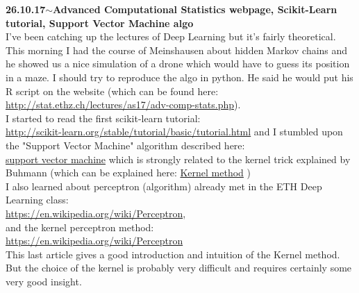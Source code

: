 \documentclass[11pt,a4paper]{article}
\newenvironment{loggentry}[2]%
{\noindent\textbf{#1}\hspace{1cm}$\mathbf{\sim}$\text{ }\textbf{#2}\\}{\vspace{0.5cm}}
\begin{document}
\begin{loggentry}{26.10.17}{Advanced Computational Statistics webpage, Scikit-Learn tutorial, Support Vector Machine algo}
I've been catching up the lectures of Deep Learning but it's fairly theoretical. This morning I had the course of Meinshausen about hidden Markov chains and he showed us a nice simulation of a drone which would have to guess its position in a maze. I should try to reproduce the algo in python. He said he would put his R script on the website (which can be found here:\\
\url{http://stat.ethz.ch/lectures/as17/adv-comp-stats.php}).\\
I started to read the first scikit-learn tutorial:\\
\url{http://scikit-learn.org/stable/tutorial/basic/tutorial.html}
and I stumbled upon the "Support Vector Machine" algorithm described here:\\
\href{https://en.wikipedia.org/wiki/Support_vector_machine}{support vector machine}
which is strongly related to the kernel trick explained by Buhmann (which can be explained here:
\href{https://en.wikipedia.org/wiki/Kernel_method}{Kernel method}
)\\
I also learned about perceptron (algorithm) already met in the ETH Deep Learning class:\\
\url{https://en.wikipedia.org/wiki/Perceptron},\\
and the kernel perceptron method:\\
\url{https://en.wikipedia.org/wiki/Perceptron}\\
This last article gives a good introduction and intuition of the Kernel method.\\
But the choice of the kernel is probably very difficult and requires certainly some very good insight.\\
\end{loggentry}
\end{document}
